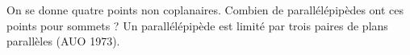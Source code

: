 On se donne quatre points non coplanaires. Combien de parallélépipèdes ont ces points pour sommets ? Un parallélépipède est limité par trois paires de plans parallèles (AUO 1973).
